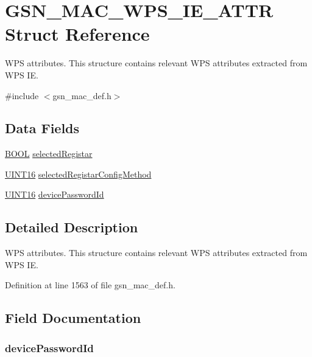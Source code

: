 \hypertarget{a00138}{
\section{GSN\_\-MAC\_\-WPS\_\-IE\_\-ATTR Struct Reference}
\label{a00138}
}


WPS attributes. This structure contains relevant WPS attributes extracted from WPS IE.  




{\ttfamily \#include $<$gsn\_\-mac\_\-def.h$>$}

\subsection*{Data Fields}
\begin{DoxyCompactItemize}
\item 
\hyperlink{a00660_ga1f04022c0a182c51c059438790ea138c}{BOOL} \hyperlink{a00138_a6474b96bcd1ccb485c92e5f6893348b4}{selectedRegistar}
\item 
\hyperlink{a00660_ga09f1a1fb2293e33483cc8d44aefb1eb1}{UINT16} \hyperlink{a00138_a4e2e89b26de79aec390592f8db0b09e5}{selectedRegistarConfigMethod}
\item 
\hyperlink{a00660_ga09f1a1fb2293e33483cc8d44aefb1eb1}{UINT16} \hyperlink{a00138_a495a91038580d46cbb96134a9e36e32a}{devicePasswordId}
\end{DoxyCompactItemize}


\subsection{Detailed Description}
WPS attributes. This structure contains relevant WPS attributes extracted from WPS IE. 

Definition at line 1563 of file gsn\_\-mac\_\-def.h.



\subsection{Field Documentation}
\hypertarget{a00138_a495a91038580d46cbb96134a9e36e32a}{
\subsubsection[{devicePasswordId}]{ {\bf devicePasswordId}}}
\label{a00138_a495a91038580d46cbb96134a9e36e32a}


